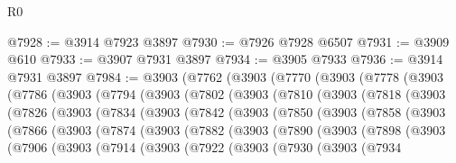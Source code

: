 \begin{lexlean}{R0}
\begin{coremodule}
@7928 := @3914 @7923 @3897
@7930 := @7926 @7928 @6507
@7931 := @3909 @610
@7933 := @3907 @7931 @3897
@7934 := @3905 @7933
@7936 := @3914 @7931 @3897
@7984 := @3903
    (@7762
      (@3903
        (@7770
          (@3903
            (@7778
              (@3903
                (@7786
                  (@3903
                    (@7794
                      (@3903
                        (@7802
                          (@3903
                            (@7810
                              (@3903
                                (@7818
                                  (@3903
                                    (@7826
                                      (@3903
                                        (@7834
                                          (@3903
                                            (@7842
                                              (@3903
                                                (@7850
                                                  (@3903
                                                    (@7858
                                                      (@3903
                                                        (@7866
                                                          (@3903
                                                            (@7874
                                                              (@3903
                                                                (@7882
                                                                  (@3903
                                                                    (@7890
                                                                      (@3903
                                                                        (@7898
                                                                          (@3903
                                                                            (@7906
                                                                              (@3903
                                                                                (@7914
                                                                                  (@3903
                                                                                    (@7922
                                                                                      (@3903
                                                                                        (@7930
                                                                                          (@3903
                                                                                            (@7934

\end{coremodule}
\end{lexlean}

